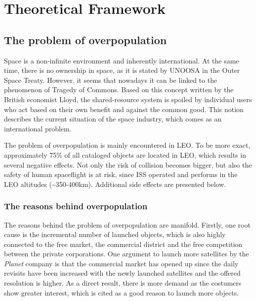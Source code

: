 \chapter{Theoretical Framework}
\label{chap:2}

\section{The problem of overpopulation}
\bigskip

Space is a non-infinite environment and inherently %
international. At the same time, there is no ownership in space, as it is stated by UNOOSA in the Outer Space Treaty. However, it seems that nowadays it can be linked to the phenomenon of Tragedy of Commons. Based on this concept written by the British economist Lloyd, the shared-resource system is spoiled by individual users who act based on their own benefit and against the common good. This notion describes the current situation of the space industry, which comes as an international problem.

The problem of overpopulation is mainly encountered in LEO. To be more exact, approximately 75\% of all cataloged objects are located in LEO, which results in several negative effects. Not only the risk of collision becomes bigger, but also the safety of human spaceflight is at risk, since ISS operated and performs in the LEO altitudes (\textasciitilde 350-400km). \cite{Kramer 2002} Additional side effects are presented below.


\bigskip
\subsection{The reasons behind overpopulation}
\bigskip
The reasons behind the problem of overpopulation are manifold. Firstly, one root cause is the incremental number of launched objects, which is also highly connected to the free market, the commercial district and the free competition between the private corporations. %
One argument to launch more satellites by the \textit{Planet} company is that the commercial market has opened up since the daily revisits have been increased with the newly launched satellites and the offered resolution is higher. As a direct result, there is more demand as the costumers show greater interest, which is cited as a good reason to launch more objects. \cite{CNBC}

